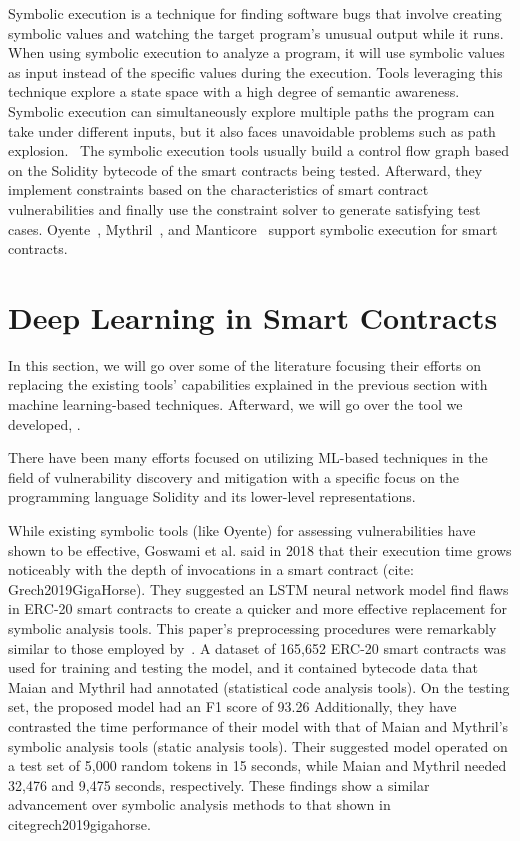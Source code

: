 Symbolic execution is a technique for finding software bugs that involve creating symbolic values and watching the target program's unusual output while it runs.
When using symbolic execution to analyze a program, it will use symbolic values as input instead of the specific values during the execution.
Tools leveraging this technique explore a state space with a high degree of semantic awareness.~\cite{boyer1975select}
Symbolic execution can simultaneously explore multiple paths the program can take under different inputs, but it also faces unavoidable problems such as path explosion.~\cite{Empirical-Evaluation-of-Smart-Contract-Testing:What-is-the-Best-Choice}
The symbolic execution tools usually build a control flow graph based on the Solidity bytecode of the smart contracts being tested.
Afterward, they implement constraints based on the characteristics of smart contract vulnerabilities and finally use the constraint solver to generate satisfying test cases.
Oyente~\cite{oyente}, Mythril~\cite{mythril}, and Manticore~\cite{mossberg2019manticore} support symbolic execution for smart contracts.


\section{Deep Learning in Smart Contracts} \label{sec:dl-models}

In this section, we will go over some of the literature focusing their efforts on replacing the existing tools' capabilities explained in the previous section with machine learning-based techniques.
Afterward, we will go over the tool we developed, \slithersimil.

There have been many efforts focused on utilizing ML-based techniques in the field of vulnerability discovery and mitigation with a specific focus on the programming language Solidity and
its lower-level representations.

While existing symbolic tools (like Oyente) for assessing vulnerabilities have shown to be effective, Goswami et al. said in 2018 that their execution time grows noticeably with the depth of invocations in a smart contract (cite: Grech2019GigaHorse).
They suggested an LSTM neural network model find flaws in ERC-20 smart contracts to create a quicker and more effective replacement for symbolic analysis tools.
This paper's preprocessing procedures were remarkably similar to those employed by~\cite{madmax}.
A dataset of 165,652 ERC-20 smart contracts was used for training and testing the model, and it contained bytecode data that Maian and Mythril had annotated (statistical code analysis tools).
On the testing set, the proposed model had an F1 score of 93.26%
Additionally, they have contrasted the time performance of their model with that of Maian and Mythril's symbolic analysis tools (static analysis tools).
Their suggested model operated on a test set of 5,000 random tokens in 15 seconds, while Maian and Mythril needed 32,476 and 9,475 seconds, respectively.
These findings show a similar advancement over symbolic analysis methods to that shown in citegrech2019gigahorse.

